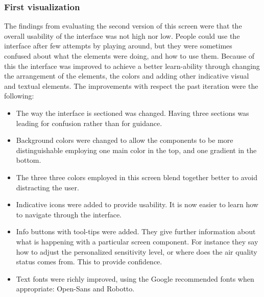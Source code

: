 \subsubsection{First visualization}
The findings from evaluating the second version of this screen were that the overall usability of the interface was not high nor low. People could use the interface after few attempts by playing around, but they were sometimes confused about what the elements were doing, and how to use them. Because of this the interface was improved to achieve a better learn-ability through changing the arrangement of the elements, the colors and adding other indicative visual and textual elements.
The improvements with respect the past iteration were the following:
\begin{itemize}
	\item  The way the interface is sectioned was changed. Having three sections was leading for confusion rather than for guidance.
    \item Background colors were changed to allow the components to be more distinguishable employing one main color in the top, and one gradient in the bottom.
    \item  The three three colors employed in this screen blend together better to avoid distracting the user.
    \item Indicative icons were added to provide usability. It is now easier to learn how to navigate through the interface.
    \item Info buttons with tool-tips were added. They give further information about what is happening with a particular screen component. For instance they say how to adjust the personalized sensitivity level, or where does the air quality status comes from. This to provide confidence. 
    \item Text fonts were richly improved, using the Google recommended fonts when appropriate:  Open-Sans and Robotto.
\end{itemize}

